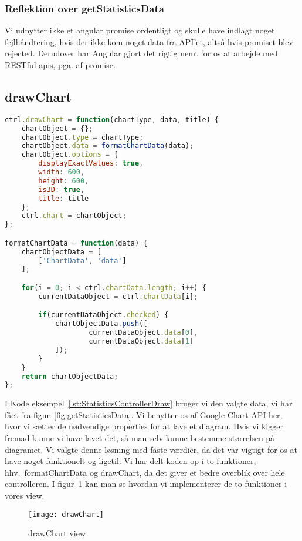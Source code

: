 \subsubsection{Reflektion over getStatisticsData}
Vi udnytter ikke et angular promise ordentligt og skulle have indlagt noget fejlhåndtering, hvis der ikke kom noget data fra API'et,
altså hvis promiset blev rejected.
Derudover har Angular gjort det rigtig nemt for os at arbejde med RESTful apis, pga. af promise.
\subsection{drawChart}
\begin{lstlisting}[caption={drawChart}, language={JavaScript}, label={lst:StatisticsControllerDraw}]
ctrl.drawChart = function(chartType, data, title) {
    chartObject = {};
    chartObject.type = chartType;
    chartObject.data = formatChartData(data);
    chartObject.options = {
        displayExactValues: true,
        width: 600,
        height: 600,
        is3D: true,
        title: title
    };
    ctrl.chart = chartObject;
};

formatChartData = function(data) {
    chartObjectData = [
        ['ChartData', 'data']
    ];

    for(i = 0; i < ctrl.chartData.length; i++) {
        currentDataObject = ctrl.chartData[i];

        if(currentDataObject.checked) {
            chartObjectData.push([
                    currentDataObject.data[0],
                    currentDataObject.data[1]
            ]);
        }
    }
    return chartObjectData;
};
\end{lstlisting}
I Kode eksempel~\ref{lst:StatisticsControllerDraw} bruger vi den valgte data, vi har fået fra figur~\ref{fig:getStatisticsData}.
Vi benytter os af \hyperlink{GoogleChartAPI}{Google Chart API} her, hvor vi sætter de nødvendige properties for at lave et diagram.
Hvis vi kigger fremad kunne vi have lavet det, så man selv kunne bestemme størrelsen på diagramet. Vi valgte denne løsning med faste værdier, da det var vigtigt for os at have noget funktionelt
og ligetil.
Vi har delt koden op i to funktioner, hhv.\ formatChartData og drawChart, da det giver et bedre overblik over hele controlleren.
I figur~\ref{fig:drawChart} kan man se hvordan vi implementerer de to funktioner i vores view.
\begin{figure}[H]
\centering
\texttt{[image: drawChart]}
\caption{drawChart view}
\label{fig:drawChart}
\end{figure}
